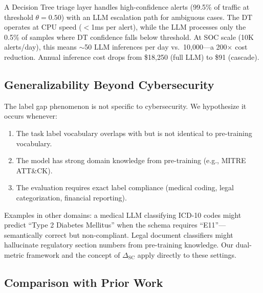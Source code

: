 \documentclass[journal]{IEEEtran}
\begin{document}
A Decision Tree triage layer handles high-confidence alerts (99.5\% of traffic at threshold $\theta=0.50$) with an LLM escalation path for ambiguous cases. The DT operates at CPU speed ($<$1ms per alert), while the LLM processes only the 0.5\% of samples where DT confidence falls below threshold. At SOC scale (10K alerts/day), this means $\sim$50 LLM inferences per day vs.\ 10,000---a 200$\times$ cost reduction. Annual inference cost drops from \$18,250 (full LLM) to \$91 (cascade).

\subsection{Generalizability Beyond Cybersecurity}
The label gap phenomenon is not specific to cybersecurity. We hypothesize it occurs whenever:
\begin{enumerate}
\item The task label vocabulary overlaps with but is not identical to pre-training vocabulary.
\item The model has strong domain knowledge from pre-training (e.g., MITRE ATT\&CK).
\item The evaluation requires exact label compliance (medical coding, legal categorization, financial reporting).
\end{enumerate}

Examples in other domains: a medical LLM classifying ICD-10 codes might predict ``Type 2 Diabetes Mellitus'' when the schema requires ``E11''---semantically correct but non-compliant. Legal document classifiers might hallucinate regulatory section numbers from pre-training knowledge. Our dual-metric framework and the concept of $\Delta_\text{SC}$ apply directly to these settings.

\subsection{Comparison with Prior Work}
\end{document}
